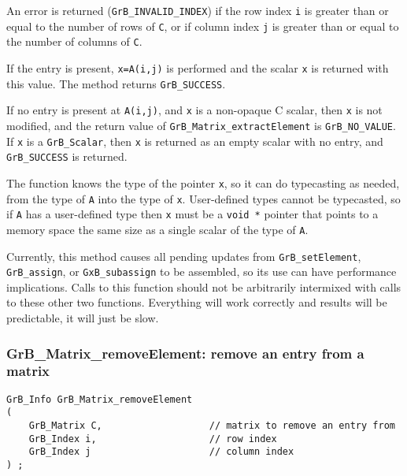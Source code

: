 \documentclass[12pt]{article}
\begin{document}
{An error is returned (\verb'GrB_INVALID_INDEX') if the row index \verb'i' is
greater than or equal to the number of rows of \verb'C', or if column index
\verb'j' is greater than or equal to the number of columns of \verb'C'.

If the entry is present, \verb'x=A(i,j)' is performed and the scalar \verb'x'
is returned with this value.  The method returns \verb'GrB_SUCCESS'.

If no entry is present at \verb'A(i,j)', and \verb'x' is a non-opaque C scalar,
then \verb'x' is not modified, and the return value of
\verb'GrB_Matrix_extractElement' is \verb'GrB_NO_VALUE'.  If \verb'x' is a
\verb'GrB_Scalar', then \verb'x' is returned as an empty scalar with no entry,
and \verb'GrB_SUCCESS' is returned.

The function knows the type of the pointer \verb'x', so it can do typecasting
as needed, from the type of \verb'A' into the type of \verb'x'.  User-defined
types cannot be typecasted, so if \verb'A' has a user-defined type then
\verb'x' must be a \verb'void *' pointer that points to a memory space the same
size as a single scalar of the type of \verb'A'.

Currently, this method causes all pending updates from
\verb'GrB_setElement', \verb'GrB_assign', or \verb'GxB_subassign' to be
assembled, so its use can have performance implications.  Calls to this
function should not be arbitrarily intermixed with calls to these other two
functions.  Everything will work correctly and results will be predictable, it
will just be slow.

\newpage
\subsubsection{{\sf GrB\_Matrix\_removeElement:} remove an entry from a matrix}
\label{matrix_removeElement}

\begin{mdframed}[userdefinedwidth=6in]
{\footnotesize
\begin{verbatim}
GrB_Info GrB_Matrix_removeElement
(
    GrB_Matrix C,                   // matrix to remove an entry from
    GrB_Index i,                    // row index
    GrB_Index j                     // column index
) ;
\end{verbatim} } \end{mdframed}

}
\end{document}
